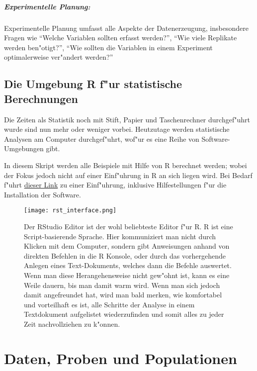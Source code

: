 \documentclass[a4paper,twoside]{tufte-book}\usepackage[]{graphicx}\usepackage[]{color}
\begin{document}
	\paragraph{Experimentelle Planung:} Experimentelle Planung umfasst alle Aspekte der Datenerzeugung, insbesondere Fragen wie "`Welche Variablen sollten erfasst werden?"', "`Wie viele Replikate werden ben"otigt?"', "`Wie sollten die Variablen in einem Experiment optimalerweise ver"andert werden?"'
	
	
	\section{Die Umgebung R f"ur statistische Berechnungen}
	
	Die Zeiten als Statistik noch mit Stift, Papier und Taschenrechner durchgef"uhrt wurde sind nun mehr oder weniger vorbei. Heutzutage werden statistische Analysen am Computer durchgef"uhrt, wof"ur es eine Reihe von Software-Umgebungen gibt.
	
	In diesem Skript werden alle Beispiele mit Hilfe von R berechnet werden; wobei der Fokus jedoch nicht auf einer Einf"uhrung in R an sich liegen wird. Bei Bedarf f"uhrt  \href{http://biometry.github.io/APES/R/R10-gettingStarted.html}{dieser Link} zu einer Einf"uhrung, inklusive Hilfestellungen f"ur die Installation der Software.
	
	\begin{figure}[]
		\begin{center}
			\texttt{[image: rst\_interface.png]}
			\caption{Der RStudio Editor ist der wohl beliebteste Editor f"ur R. R ist eine Script-basierende Sprache. Hier kommuniziert man nicht durch Klicken mit dem Computer, sondern gibt Anweisungen anhand von direkten Befehlen in die R Konsole, oder durch das vorhergehende Anlegen eines Text-Dokuments, welches dann die Befehle auswertet. Wenn man diese Herangehensweise nicht gew"ohnt ist, kann es eine Weile dauern, bis man damit warm wird. Wenn man sich jedoch damit angefreundet hat, wird man bald merken, wie komfortabel und vorteilhaft es ist, alle Schritte der Analyse in einem Textdokument aufgelistet wiederzufinden und somit alles zu jeder Zeit nachvollziehen zu k"onnen.}
			\label{fig: Rstudio}
		\end{center}
	\end{figure}
	
	
	
	\chapter{Daten, Proben und Populationen}
	
\end{document}
